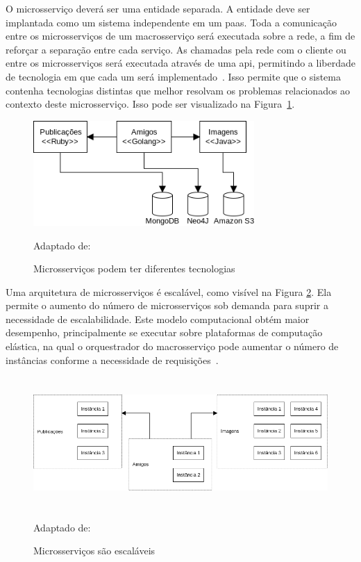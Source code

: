 O microsserviço deverá ser uma entidade separada.
%
A entidade deve ser implantada como um sistema independente em um \ac{paas}.
%
Toda a comunicação entre os microsserviços de um macrosserviço será executada sobre a rede, a fim de reforçar a separação entre cada serviço.
%
As chamadas pela rede com o cliente ou entre os microsserviços será executada através de uma \ac{api}, permitindo a liberdade de tecnologia em que cada um será implementado~\cite{Newman2015Feb}.
%
Isso permite que o sistema contenha tecnologias distintas que melhor resolvam os problemas relacionados ao contexto deste microsserviço.
%
Isso pode ser visualizado na Figura~\ref{fig:microsservicos_tecnologias}.



\begin{figure}[htb!]
\caption{Microsserviços podem ter diferentes tecnologias}
\label{fig:microsservicos_tecnologias}
\includegraphics[height=4cm]{img/cap2/microsservicos_tecnologias.png}
\centering

Adaptado de:~\cite{Newman2015Feb}
\end{figure}



Uma arquitetura de microsserviços é escalável, como visível na Figura \ref{fig:microsservicos_escalabilidade}.
%
Ela permite o aumento do número de microsserviços sob demanda para suprir a necessidade de escalabilidade.
%
Este modelo computacional obtém maior desempenho, principalmente se executar sobre plataformas de computação elástica, na qual o orquestrador do macrosserviço pode aumentar o número de instâncias conforme a necessidade de requisições~\cite{Nadareishvili2016Aug}.



\begin{figure}[htb!]
\caption{Microsserviços são escaláveis}
\label{fig:microsservicos_escalabilidade}
\includegraphics[height=5cm]{img/cap2/microsservicos_escalabilidade.png}
\centering

Adaptado de:~\cite{Newman2015Feb}
\end{figure}




